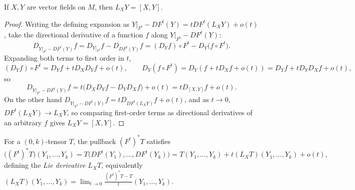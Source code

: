 \begin{proposition}
  \label{prop:pet-ch2-lie-derivative-bracket}
  \leanok
  If $X,Y$ are vector fields on $M$, then $L_XY=[X,Y]$.
\end{proposition}
\begin{proof}
  \leanok
  Writing the defining expansion as $Y|_{F^t}-DF^t(Y)=tDF^t(L_XY)+o(t)$, take the
  directional derivative of a function $f$ along $Y|_{F^t}-DF^t(Y)$:
  \[
    D_{Y|_{F^t}-DF^t(Y)}f
    = D_{Y|_{F^t}}f-D_{DF^t(Y)}f
    = (D_Yf)\circ F^t-D_Y\big(f\circ F^t\big).
  \]
  Expanding both terms to first order in $t$,
  \[
    (D_Yf)\circ F^t = D_Yf+tD_XD_Yf+o(t),
    \qquad
    D_Y(f\circ F^t) = D_Y(f+tD_Xf+o(t)) = D_Yf+tD_YD_Xf+o(t),
  \]
  so
  \[
    D_{Y|_{F^t}-DF^t(Y)}f = t\big(D_XD_Yf-D_YD_Xf\big)+o(t) = tD_{[X,Y]}f+o(t).
  \]
  On the other hand $D_{Y|_{F^t}-DF^t(Y)}f = tD_{DF^t(L_XY)}f+o(t)$, and as $t\to0$,
  $DF^t(L_XY)\to L_XY$, so comparing first-order terms as directional
  derivatives of an arbitrary $f$ gives $L_XY=[X,Y]$.
\end{proof}

\begin{definition}
  \label{def:pet-ch2-lie-derivative-tensor}
  \leanok
  For a $(0,k)$-tensor $T$, the pullback $(F^t)^*T$ satisfies
  \[
    \big((F^t)^*T\big)(Y_1,\dots,Y_k)=T\big(DF^t(Y_1),\dots,DF^t(Y_k)\big)
    =T(Y_1,\dots,Y_k)+t(L_XT)(Y_1,\dots,Y_k)+o(t),
  \]
  defining the \emph{Lie derivative} $L_XT$, equivalently
  $(L_XT)(Y_1,\dots,Y_k)=\lim_{t\to0}\frac{(F^t)^*T-T}{t}(Y_1,\dots,Y_k)$.
\end{definition}

